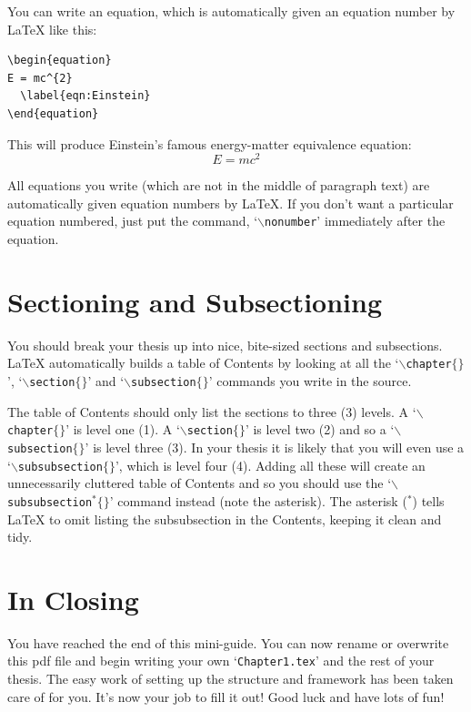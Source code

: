 You can write an equation, which is automatically given an equation number by \LaTeX{} like this:
\begin{verbatim}
\begin{equation}
E = mc^{2}
  \label{eqn:Einstein}
\end{equation}
\end{verbatim}

This will produce Einstein's famous energy-matter equivalence equation:
\begin{equation}
E = mc^{2}
\label{eqn:Einstein}
\end{equation}

All equations you write (which are not in the middle of paragraph text) are automatically given equation numbers by \LaTeX{}. If you don't want a particular equation numbered, just put the command, `$\backslash$\texttt{nonumber}' immediately after the equation.


\section{Sectioning and Subsectioning}

You should break your thesis up into nice, bite-sized sections and subsections. \LaTeX{} automatically builds a table of Contents by looking at all the `$\backslash$\texttt{chapter}$\{\}$', `$\backslash$\texttt{section}$\{\}$' and `$\backslash$\texttt{subsection}$\{\}$' commands you write in the source.

The table of Contents should only list the sections to three (3) levels. A `$\backslash$\texttt{chapter}$\{\}$' is level one (1). A `$\backslash$\texttt{section}$\{\}$' is level two (2) and so a `$\backslash$\texttt{subsection}$\{\}$' is level three (3). In your thesis it is likely that you will even use a `$\backslash$\texttt{subsubsection}$\{\}$', which is level four (4). Adding all these will create an unnecessarily cluttered table of Contents and so you should use the `$\backslash$\texttt{subsubsection$^{*}\{\}$}' command instead (note the asterisk). The asterisk ($^{*}$) tells \LaTeX{} to omit listing the subsubsection in the Contents, keeping it clean and tidy.


\section{In Closing}

You have reached the end of this mini-guide. You can now rename or overwrite this pdf file and begin writing your own `\texttt{Chapter1.tex}' and the rest of your thesis. The easy work of setting up the structure and framework has been taken care of for you. It's now your job to fill it out!
Good luck and have lots of fun!

